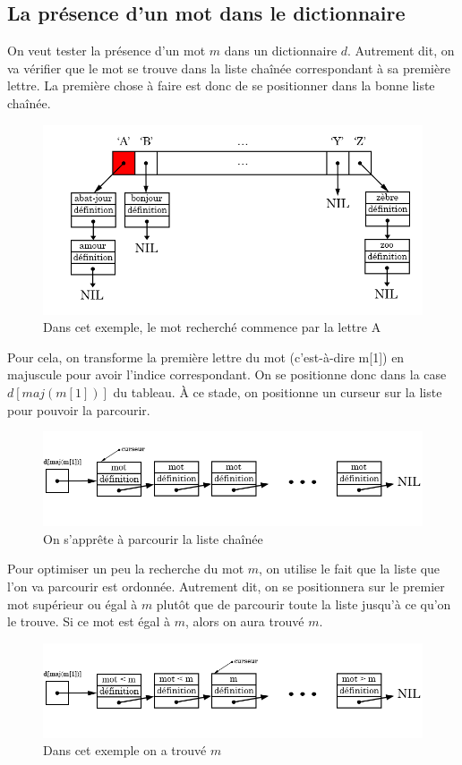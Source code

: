 \documentclass[a4paper, titlepage]{livret} %
\begin{document}
			\subsection{La présence d'un mot dans le dictionnaire}
				On veut tester la présence d'un mot $m$ dans un dictionnaire $d$.
				Autrement dit, on va vérifier que le mot se trouve dans la liste chaînée correspondant à sa première lettre.
				La première chose à faire est donc de se positionner dans la \og bonne \fg{} liste chaînée.
				\begin{figure}[!ht]
				\centering
  					\includegraphics[scale=0.45]{estPresent1.png}
  					\caption{Dans cet exemple, le mot recherché commence par la lettre A} 
				\end{figure}
				\newpage

				Pour cela, on transforme la première lettre du mot (c'est-à-dire m[1]) en majuscule pour avoir l'indice correspondant.
				On se positionne donc dans la case $d[maj(m[1])]$ du tableau.
				À ce stade, on positionne un curseur sur la liste pour pouvoir la parcourir.
				\begin{figure}[!ht]
				\centering
  					\includegraphics[scale=0.45]{estPresent2.png}
  					\caption{On s'apprête à parcourir la liste chaînée} 
				\end{figure}


				Pour optimiser un peu la recherche du mot $m$, on utilise le fait que la liste que l'on va parcourir est ordonnée.
				Autrement dit, on se positionnera sur le premier mot supérieur ou égal à $m$ plutôt que de parcourir toute la liste jusqu'à ce qu'on le trouve.
				Si ce mot est égal à $m$, alors on aura trouvé $m$. 
				\begin{figure}[!ht]
				\centering
  					\includegraphics[scale=0.45]{estPresent3.png}
  					\caption{Dans cet exemple on a trouvé $m$} 
				\end{figure}
				\newpage
\end{document}
